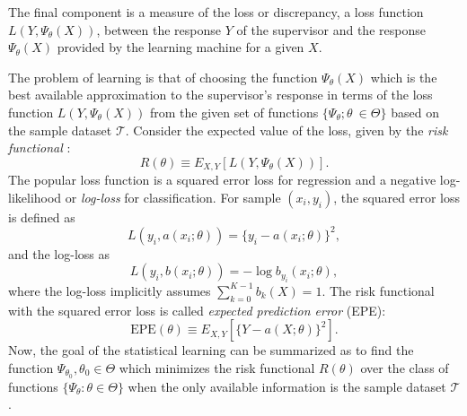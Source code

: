 \documentclass[12pt]{article}
\begin{document}
The final component is a measure of the loss or discrepancy, a loss function $L(Y, \Psi_{\theta}(X))$, between the response $Y$ of the supervisor and the response $\Psi_{\theta}(X)$ provided by the learning machine for a given $X$.

The problem of learning is that of choosing the function $\Psi_{\theta}(X)$ which is the best available approximation to the supervisor's response in terms of the loss function $L(Y, \Psi_{\theta}(X))$ from the given set of functions $\{\Psi_{\theta};\theta\ \in \Theta\}$ based on the sample dataset $\mathcal{T}$. Consider the expected value of the loss, given by the {\it risk functional} \parencite{Vapnik1999}:
\begin{equation*}
R(\theta) \equiv E_{X,Y}[L(Y, \Psi_{\theta}(X))].
\end{equation*}
The popular loss function is a squared error loss for regression and a negative log-likelihood or {\it log-loss} for classification. For sample $(x_i,y_i)$, the squared error loss is defined as
\begin{equation*}
L(y_i, a(x_i;\theta)) = \{y_i - a(x_i;\theta)\}^2,
\end{equation*}
and the log-loss as
\begin{equation*}
L(y_i, b(x_i;\theta)) = - \log b_{y_i}(x_i;\theta),
\end{equation*}
where the log-loss implicitly assumes $\sum_{k=0}^{K-1} b_k(X) = 1$. The risk functional with the squared error loss is called {\it expected prediction error} (EPE):
\begin{equation*}
{\mathrm {EPE}}(\theta) \equiv E_{X,Y}[\{Y - a(X;\theta)\}^2].
\end{equation*}
Now, the goal of the statistical learning can be summarized as to find the function $\Psi_{\theta_0}, \theta_0 \in \Theta$ which minimizes the risk functional $R(\theta)$ over the class of functions $\{\Psi_{\theta}:\theta \in \Theta\}$ when the only available information is the sample dataset $\mathcal{T}$.
\end{document}
